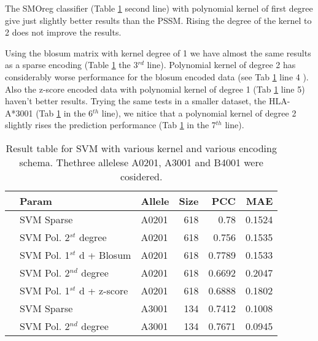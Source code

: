 The SMOreg classifier (Table \ref{tab:svm1} second line) with polynomial kernel of first degree give just slightly better results than the PSSM. Rising the degree of the kernel to 2 does not improve the results.

Using the blosum matrix with kernel degree of 1 we have almost the same results as a sparse encoding (Table \ref{tab:svm1} the 3$^{rd}$ line). Polynomial kernel of degree 2 has considerably worse performance for the blosum encoded data (see Tab \ref{tab:svm1} line 4 ). Also the z-score encoded data with polynomial kernel of degree 1 (Tab \ref{tab:svm1} line 5) haven't better results.
Trying the same tests in a smaller dataset, the HLA-A*3001 (Tab \ref{tab:svm1} in the 6$^{th}$ line), we nitice that a polynomial kernel of degree 2 slightly rises the prediction performance (Tab \ref{tab:svm1} in the 7$^{th}$ line).

\begin{table}[ht]\scriptsize
\begin{center}
\begin{tabular}{rllrrr}
  \hline
 & Param & Allele & Size & PCC & MAE \\ 
  \hline
 & SVM Sparse & A0201 &   618 & 0.78 & 0.1524 \\ 
 & SVM Pol. 2$^{st}$ degree & A0201 &   618 & 0.756 & 0.1535 \\ 
 & SVM Pol. 1$^{st}$ d + Blosum & A0201 &   618 & 0.7789 & 0.1533 \\ 
 & SVM Pol. 2$^{nd}$ degree & A0201 &   618 & 0.6692 & 0.2047 \\ 
 & SVM Pol. 1$^{st}$ d + z-score & A0201 &   618 & 0.6888 & 0.1802 \\ 
 & SVM Sparse & A3001 &   134 & 0.7412 & 0.1008 \\ 
 & SVM Pol. 2$^{nd}$ degree & A3001 &   134 & 0.7671 & 0.0945 \\ 
   \hline
\end{tabular}
\end{center}
\caption{Result table for SVM with various kernel and various encoding schema. Thethree allelese A0201, A3001 and B4001 were cosidered.}\label{tab:svm1}
\end{table}

